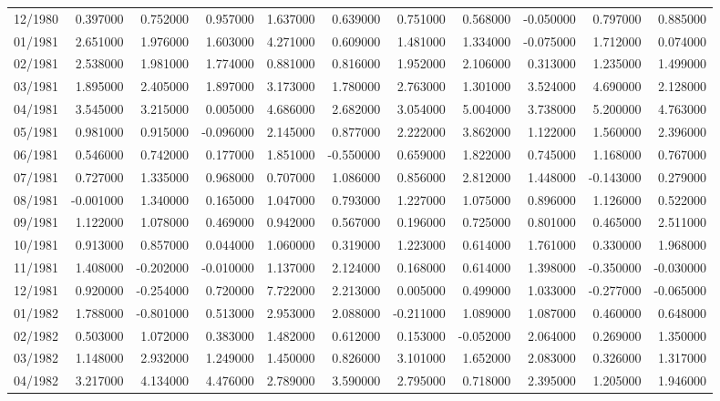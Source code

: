 \begin{tabular}{lrrrrrrrrrr}
12/1980 & 0.397000 & 0.752000 & 0.957000 & 1.637000 & 0.639000 & 0.751000 & 0.568000 & -0.050000 & 0.797000 & 0.885000 \\
01/1981 & 2.651000 & 1.976000 & 1.603000 & 4.271000 & 0.609000 & 1.481000 & 1.334000 & -0.075000 & 1.712000 & 0.074000 \\
02/1981 & 2.538000 & 1.981000 & 1.774000 & 0.881000 & 0.816000 & 1.952000 & 2.106000 & 0.313000 & 1.235000 & 1.499000 \\
03/1981 & 1.895000 & 2.405000 & 1.897000 & 3.173000 & 1.780000 & 2.763000 & 1.301000 & 3.524000 & 4.690000 & 2.128000 \\
04/1981 & 3.545000 & 3.215000 & 0.005000 & 4.686000 & 2.682000 & 3.054000 & 5.004000 & 3.738000 & 5.200000 & 4.763000 \\
05/1981 & 0.981000 & 0.915000 & -0.096000 & 2.145000 & 0.877000 & 2.222000 & 3.862000 & 1.122000 & 1.560000 & 2.396000 \\
06/1981 & 0.546000 & 0.742000 & 0.177000 & 1.851000 & -0.550000 & 0.659000 & 1.822000 & 0.745000 & 1.168000 & 0.767000 \\
07/1981 & 0.727000 & 1.335000 & 0.968000 & 0.707000 & 1.086000 & 0.856000 & 2.812000 & 1.448000 & -0.143000 & 0.279000 \\
08/1981 & -0.001000 & 1.340000 & 0.165000 & 1.047000 & 0.793000 & 1.227000 & 1.075000 & 0.896000 & 1.126000 & 0.522000 \\
09/1981 & 1.122000 & 1.078000 & 0.469000 & 0.942000 & 0.567000 & 0.196000 & 0.725000 & 0.801000 & 0.465000 & 2.511000 \\
10/1981 & 0.913000 & 0.857000 & 0.044000 & 1.060000 & 0.319000 & 1.223000 & 0.614000 & 1.761000 & 0.330000 & 1.968000 \\
11/1981 & 1.408000 & -0.202000 & -0.010000 & 1.137000 & 2.124000 & 0.168000 & 0.614000 & 1.398000 & -0.350000 & -0.030000 \\
12/1981 & 0.920000 & -0.254000 & 0.720000 & 7.722000 & 2.213000 & 0.005000 & 0.499000 & 1.033000 & -0.277000 & -0.065000 \\
01/1982 & 1.788000 & -0.801000 & 0.513000 & 2.953000 & 2.088000 & -0.211000 & 1.089000 & 1.087000 & 0.460000 & 0.648000 \\
02/1982 & 0.503000 & 1.072000 & 0.383000 & 1.482000 & 0.612000 & 0.153000 & -0.052000 & 2.064000 & 0.269000 & 1.350000 \\
03/1982 & 1.148000 & 2.932000 & 1.249000 & 1.450000 & 0.826000 & 3.101000 & 1.652000 & 2.083000 & 0.326000 & 1.317000 \\
04/1982 & 3.217000 & 4.134000 & 4.476000 & 2.789000 & 3.590000 & 2.795000 & 0.718000 & 2.395000 & 1.205000 & 1.946000 \\

\end{tabular}
